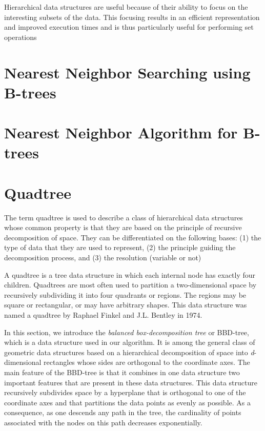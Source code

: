 \documentclass[ijoc,nonblindrev]{informs3} %
\begin{document}
Hierarchical data structures are useful because of their ability to focus on the
interesting subsets of the data. 
This focusing results in an efficient representation and improved execution times and is thus
particularly useful for performing set operations

\section{Nearest Neighbor Searching using B-trees}

\section{Nearest Neighbor Algorithm for B-trees}

\section{Quadtree}
The term quadtree is used to describe a class of hierarchical data structures whose
common property is that they are based on the principle of recursive decomposition of space.
They can be differentiated on the following bases: 
(1) the type of data that they are used to represent, 
(2) the principle guiding the decomposition process, and 
(3) the resolution (variable or not)


A quadtree is a tree data structure in which each internal node has exactly four children. 
Quadtrees are most often used to partition a two-dimensional space by recursively 
subdividing it into four quadrants or regions. 
The regions may be square or rectangular, or may have arbitrary shapes. 
This data structure was named a quadtree by Raphael Finkel and J.L. Bentley in 1974. 

In this section, we introduce the \textit{balanced box-decomposition tree} or BBD-tree,
which is a data structure used in our algorithm. 
It is among the general class of geometric data structures based on a hierarchical decomposition of space
into \textit{d}-dimensional rectangles whose sides are orthogonal to the coordinate axes.
The main feature of the BBD-tree is that it combines in one data structure two
important features that are present in these data structures.
This data structure recursively subdivides space by a hyperplane that is orthogonal to one
of the coordinate axes and that partitions the data points as evenly as possible.
As a consequence, as one descends any path in the tree, the cardinality of points
associated with the nodes on this path decreases exponentially.
\end{document}
